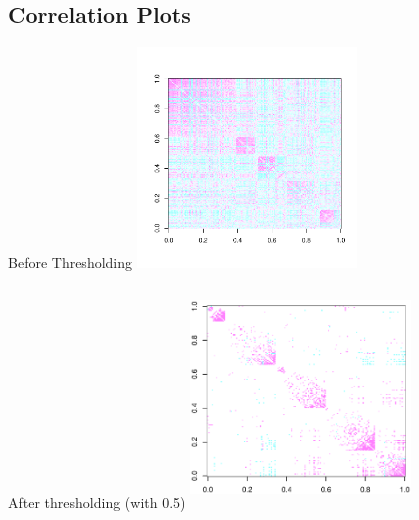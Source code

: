 \documentclass[bigger]{beamer}
\begin{document}
\subsection{Correlation Plots}
\begin{frame}
\label{sec-2-2}
\begin{multicols}{2}
	\begin{center}
	Before Thresholding
    \includegraphics[height=2.3in,width=2.3in]{correlationplot_data37.pdf}
    \end{center}
    \begin{center}
    After thresholding (with 0.5)
     \includegraphics[height=2.3in,width=2.3in]{sparse_corr.eps}
    \end{center}
\end{multicols}
\end{frame}
\end{document}
